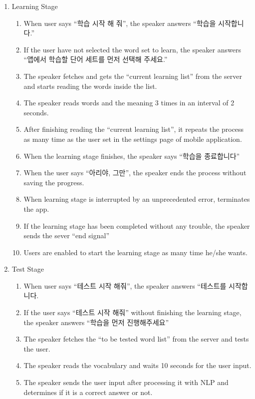 \documentclass[conference]{IEEEtran}
\begin{document}
\begin{enumerate}
    \item Learning Stage
    \begin{enumerate}
        \item When user says “학습 시작 해 줘”, the speaker answers “학습을 시작합니다.”
        \item If the user have not selected the word set to learn, the speaker answers “앱에서 학습할 단어 세트를 먼저 선택해 주세요.”
        \item The speaker fetches and gets the “current learning list” from the server and starts reading the words inside the list.
        \item The speaker reads words and the meaning 3 times in an interval of 2 seconds.
        \item After finishing reading the “current learning list”, it repeats the process as many time as the user set in the settings page of mobile application. 
        \item When the learning stage finishes, the speaker says “학습을 종료합니다”
        \item When the user says “아리야, 그만”, the speaker ends the process without saving the progress.
        \item When learning stage is interrupted by an unprecedented error, terminates the app.
        \item If the learning stage has been completed without any trouble, the speaker sends the sever “end signal”
        \item Users are enabled to start the learning stage as many time he/she wants.
    \end{enumerate}
    \item Test Stage
    \begin{enumerate}
        \item When user says “테스트 시작 해줘”, the speaker answers “테스트를 시작합니다.
        \item If the user says “테스트 시작 해줘” without finishing the learning stage, the speaker answers “학습을 먼저 진행해주세요”
        \item The speaker fetches the “to be tested word list” from the server and tests the user.
        \item The speaker reads the vocabulary and waits 10 seconds for the user input.
        \item The speaker sends the user input after processing it with NLP and determines if it is a correct answer or not.

\end{enumerate}
\end{enumerate}
\end{document}
